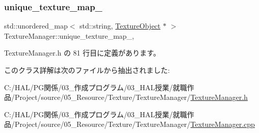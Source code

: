 \subsubsection{\texorpdfstring{unique\+\_\+texture\+\_\+map\+\_\+}{unique\_texture\_map\_}}
{\footnotesize\ttfamily std\+::unordered\+\_\+map$<$ std\+::string, \mbox{\hyperlink{class_texture_object}{Texture\+Object}} $\ast$ $>$ Texture\+Manager\+::unique\+\_\+texture\+\_\+map\+\_\+\hspace{0.3cm}{\ttfamily [static]}, {\ttfamily [private]}}



 Texture\+Manager.\+h の 81 行目に定義があります。



このクラス詳解は次のファイルから抽出されました\+:\begin{DoxyCompactItemize}
\item 
C\+:/\+H\+A\+L/\+P\+G関係/03\+\_\+作成プログラム/03\+\_\+\+H\+A\+L授業/就職作品/\+Project/source/05\+\_\+\+Resource/\+Texture/\+Texture\+Manager/\mbox{\hyperlink{_texture_manager_8h}{Texture\+Manager.\+h}}\item 
C\+:/\+H\+A\+L/\+P\+G関係/03\+\_\+作成プログラム/03\+\_\+\+H\+A\+L授業/就職作品/\+Project/source/05\+\_\+\+Resource/\+Texture/\+Texture\+Manager/\mbox{\hyperlink{_texture_manager_8cpp}{Texture\+Manager.\+cpp}}\end{DoxyCompactItemize}
